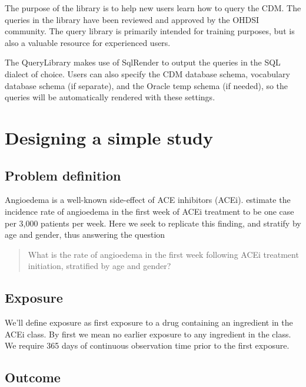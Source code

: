 \documentclass[11pt]{book}
\theoremstyle{definition}
\theoremstyle{definition}
\theoremstyle{definition}
\theoremstyle{remark}
\begin{document}
The purpose of the library is to help new users learn how to query the CDM. The queries in the library have been reviewed and approved by the OHDSI community. The query library is primarily intended for training purposes, but is also a valuable resource for experienced users.

The QueryLibrary makes use of SqlRender to output the queries in the SQL dialect of choice. Users can also specify the CDM database schema, vocabulary database schema (if separate), and the Oracle temp schema (if needed), so the queries will be automatically rendered with these settings.

\hypertarget{designing-a-simple-study}{%
\section{Designing a simple study}\label{designing-a-simple-study}}

\hypertarget{problem-definition}{%
\subsection{Problem definition}\label{problem-definition}}

Angioedema is a well-known side-effect of ACE inhibitors (ACEi). \citet{slater_1988} estimate the incidence rate of angioedema in the first week of ACEi treatment to be one case per 3,000 patients per week. Here we seek to replicate this finding, and stratify by age and gender, thus answering the question

\begin{quote}
What is the rate of angioedema in the first week following ACEi treatment initiation, stratified by age and gender?
\end{quote}

\hypertarget{exposure}{%
\subsection{Exposure}\label{exposure}}

We'll define exposure as first exposure to a drug containing an ingredient in the ACEi class. By first we mean no earlier exposure to any ingredient in the class. We require 365 days of continuous observation time prior to the first exposure.

\hypertarget{outcome}{%
\subsection{Outcome}\label{outcome}}
\end{document}
